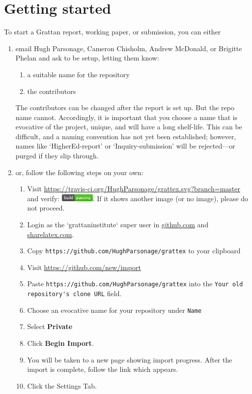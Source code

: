 \documentclass[a4paper,11pt]{scrreprt}\usepackage[]{graphicx}\usepackage[]{color}
\begin{document}
  \section{Getting started}\label{sec:getting-started}
  To start a Grattan report, working paper, or submission, you can either
  \begin{enumerate}
  \item email Hugh Parsonage, Cameron Chisholm, Andrew McDonald, or Brigitte Phelan and ask to be setup, letting them know:
  \begin{enumerate}
    \item a suitable name for the repository
    \item the contributors 
  \end{enumerate}
  The contributors can be changed after the report is set up. 
  But the repo name cannot. 
  Accordingly, it is important that you choose a name that is evocative of the project, unique, and will have a long shelf-life.
  This can be difficult, and a naming convention has not yet been established; however, names like `HigherEd-report' or `Inquiry-submission' will be rejected---or purged if they slip through.
  \item or, follow the following steps on your own:
    \begin{enumerate}
      \item Visit \url{https://travis-ci.org/HughParsonage/grattex.svg?branch=master} and verify: \includegraphics[height=1em]{figure/passing.png}.
      If it shows another image (or no image), please do not proceed.
      \item Login as the `grattaninstitute` super user in \href{https://github.com}{github.com} and \href{https://sharelatex.com}{sharelatex.com}.
      \item Copy \verb=https://github.com/HughParsonage/grattex= to your clipboard
      \item Visit \url{https://github.com/new/import}
      \item Paste \verb=https://github.com/HughParsonage/grattex= into the \verb=Your old repository's clone URL= field.
      \item Choose an evocative name for your repository under \verb=Name=
      \item Select \textbf{Private}
      \item Click \textbf{Begin Import}.
      \item You will be taken to a new page showing import progress. After the import is complete, follow the link which appears.
      \item Click the Settings Tab.


\end{enumerate}
\end{enumerate}
\end{document}

